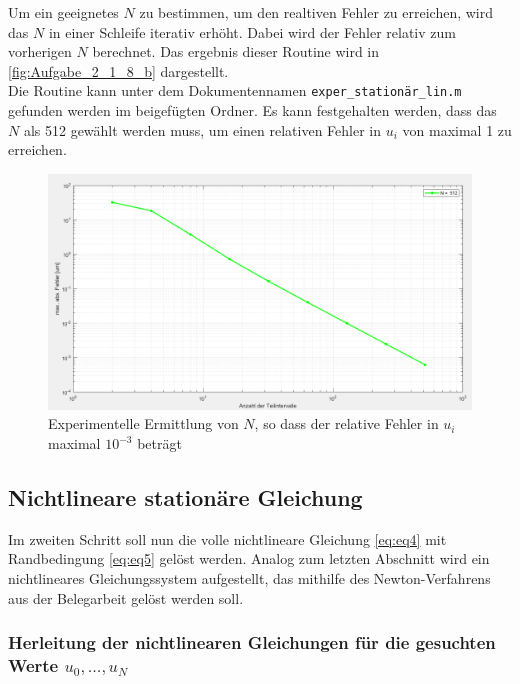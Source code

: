 \documentclass[
	pagesize,
	fontsize=12pt,
	paper=a4,
	oneside,
   reqno
]{scrartcl}
\begin{document}
Um ein geeignetes $N$ zu bestimmen, um den realtiven Fehler zu erreichen, wird das $N$ in einer Schleife iterativ erhöht. Dabei wird der Fehler relativ zum vorherigen $N$ berechnet. Das ergebnis dieser Routine wird in \autoref{fig:Aufgabe_2_1_8_b} dargestellt. \\
Die Routine kann unter dem Dokumentennamen \texttt{exper\_stationär\_lin.m} gefunden werden im beigefügten Ordner. Es kann festgehalten werden, dass das $N$ als 512 gewählt werden muss, um einen relativen Fehler in $u_i$ von maximal 1\textperthousand{} zu erreichen.

\begin{figure}[H]
   \centering
   \includegraphics[width=1\textwidth]{Bilder/Aufgabe_2_1_8_b.png}
   \caption[Experimentelle Ermittlung von $N$]{Experimentelle Ermittlung von $N$, so dass der relative Fehler in $u_i$ maximal $10^{-3}$ beträgt}
   \label{fig:Aufgabe_2_1_8_b}
\end{figure}

\subsection{Nichtlineare stationäre Gleichung}

Im zweiten Schritt soll nun die volle nichtlineare Gleichung \autoref{eq:eq4} mit Randbedingung \autoref{eq:eq5} gelöst werden. Analog zum letzten Abschnitt wird ein nichtlineares Gleichungssystem aufgestellt, das mithilfe des Newton-Verfahrens aus der Belegarbeit gelöst werden soll.

\subsubsection{Herleitung der nichtlinearen Gleichungen für die gesuchten Werte $u_0, ... , u_{N}$} \label{sec:nichtlineare_gleichungen}
\end{document}
